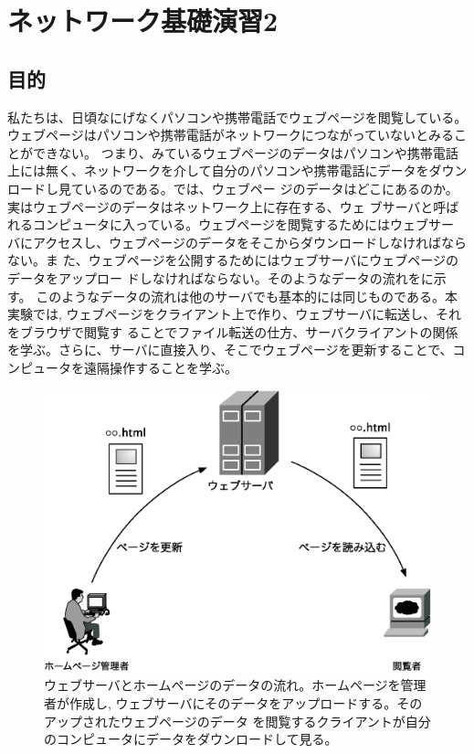 
\chapter{ネットワーク基礎演習2}
\section{目的}

私たちは、日頃なにげなくパソコンや携帯電話でウェブページを閲覧している。
ウェブページはパソコンや携帯電話がネットワークにつながっていないとみることができない。
つまり、みているウェブページのデータはパソコンや携帯電話上には無く、ネットワークを介して自分のパソコンや携帯電話にデータをダウンロードし見ているのである。では、ウェブペー
ジのデータはどこにあるのか。実はウェブページのデータはネットワーク上に存在する、ウェ
ブサーバと呼ばれるコンピュータに入っている。ウェブページを閲覧するためにはウェブサー
バにアクセスし、ウェブページのデータをそこからダウンロードしなければならない。ま
た、ウェブページを公開するためにはウェブサーバにウェブページのデータをアップロー
ドしなければならない。そのようなデータの流れをに示す。
このようなデータの流れは他のサーバでも基本的には同じものである。本実験では,
ウェブページをクライアント上で作り、ウェブサーバに転送し、それをブラウザで閲覧す
ることでファイル転送の仕方、サーバクライアントの関係を学ぶ。さらに、サーバに直接入り、そこでウェブページを更新することで、コンピュータを遠隔操作することを学ぶ。

\begin{figure}[htbp]
\begin{center}
\includegraphics[width=0.8\linewidth]{server.eps}
\caption{ウェブサーバとホームページのデータの流れ。ホームページを管理者が作成し,
    ウェブサーバにそのデータをアップロードする。そのアップされたウェブページのデータ
    を閲覧するクライアントが自分のコンピュータにデータをダウンロードして見る。}
\label{fig:server}
\end{center}
\end{figure}


